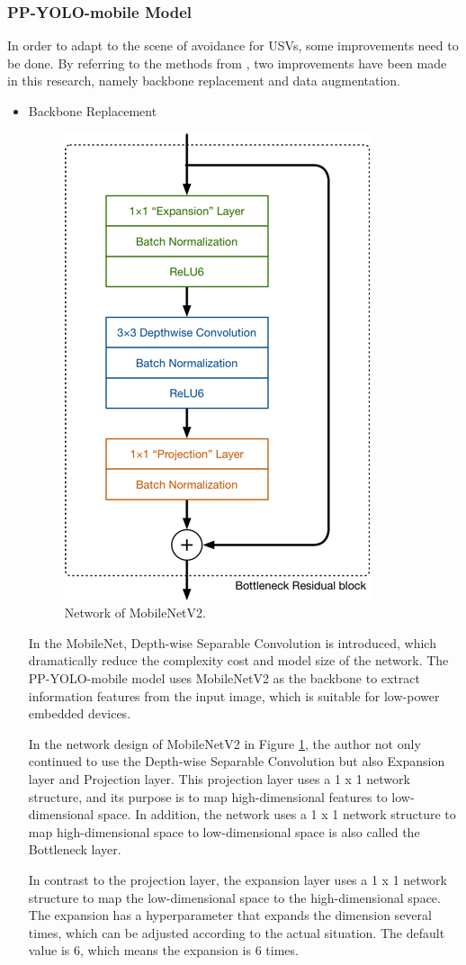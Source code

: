 \documentclass[journal,article,submit,moreauthors,pdftex]{Definitions/mdpi}
\begin{document}
\subsubsection{PP-YOLO-mobile Model}

In order to adapt to the scene of avoidance for USVs, 
some improvements need to be done. By referring to the methods from \cite{zoph2019learning, mahto2020refining, mandal2020object}, two improvements have been made in this research, namely backbone replacement and data augmentation.

\begin{itemize}
\item{Backbone Replacement}

\begin{figure}[htbp]
\centering
\includegraphics[width=0.45\columnwidth]{images/MobileNetV2-structure.png}
\caption{Network of MobileNetV2.}
\label{fig:Microstructure}
\end{figure}

In the MobileNet, Depth-wise Separable Convolution is introduced, which dramatically reduce the complexity cost and model size of the network. The PP-YOLO-mobile model uses MobileNetV2 as the backbone to extract information features from the input image, which is suitable for low-power embedded devices.



In the network design of MobileNetV2 in Figure \ref{fig:Microstructure}, the author not only continued to use the Depth-wise Separable Convolution but also Expansion layer and Projection layer. This projection layer uses a 1 x 1 network structure, and its purpose is to map high-dimensional features to low-dimensional space. In addition, the network uses a 1 x 1 network structure to map high-dimensional space to low-dimensional space is also called the Bottleneck layer.

In contrast to the projection layer, the expansion layer uses a 1 x 1 network structure to map the low-dimensional space to the high-dimensional space. The expansion has a hyperparameter that expands the dimension several times, which can be adjusted according to the actual situation. The default value is 6, which means the expansion is 6 times.



\end{itemize}
\end{document}
